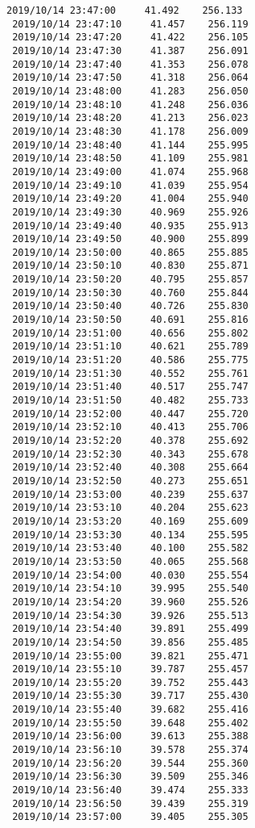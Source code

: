 \documentclass[11pt]{article}
\begin{document}
\begin{Verbatim}[commandchars=\\\{\}]
 2019/10/14 23:47:00     41.492    256.133
 2019/10/14 23:47:10     41.457    256.119
 2019/10/14 23:47:20     41.422    256.105
 2019/10/14 23:47:30     41.387    256.091
 2019/10/14 23:47:40     41.353    256.078
 2019/10/14 23:47:50     41.318    256.064
 2019/10/14 23:48:00     41.283    256.050
 2019/10/14 23:48:10     41.248    256.036
 2019/10/14 23:48:20     41.213    256.023
 2019/10/14 23:48:30     41.178    256.009
 2019/10/14 23:48:40     41.144    255.995
 2019/10/14 23:48:50     41.109    255.981
 2019/10/14 23:49:00     41.074    255.968
 2019/10/14 23:49:10     41.039    255.954
 2019/10/14 23:49:20     41.004    255.940
 2019/10/14 23:49:30     40.969    255.926
 2019/10/14 23:49:40     40.935    255.913
 2019/10/14 23:49:50     40.900    255.899
 2019/10/14 23:50:00     40.865    255.885
 2019/10/14 23:50:10     40.830    255.871
 2019/10/14 23:50:20     40.795    255.857
 2019/10/14 23:50:30     40.760    255.844
 2019/10/14 23:50:40     40.726    255.830
 2019/10/14 23:50:50     40.691    255.816
 2019/10/14 23:51:00     40.656    255.802
 2019/10/14 23:51:10     40.621    255.789
 2019/10/14 23:51:20     40.586    255.775
 2019/10/14 23:51:30     40.552    255.761
 2019/10/14 23:51:40     40.517    255.747
 2019/10/14 23:51:50     40.482    255.733
 2019/10/14 23:52:00     40.447    255.720
 2019/10/14 23:52:10     40.413    255.706
 2019/10/14 23:52:20     40.378    255.692
 2019/10/14 23:52:30     40.343    255.678
 2019/10/14 23:52:40     40.308    255.664
 2019/10/14 23:52:50     40.273    255.651
 2019/10/14 23:53:00     40.239    255.637
 2019/10/14 23:53:10     40.204    255.623
 2019/10/14 23:53:20     40.169    255.609
 2019/10/14 23:53:30     40.134    255.595
 2019/10/14 23:53:40     40.100    255.582
 2019/10/14 23:53:50     40.065    255.568
 2019/10/14 23:54:00     40.030    255.554
 2019/10/14 23:54:10     39.995    255.540
 2019/10/14 23:54:20     39.960    255.526
 2019/10/14 23:54:30     39.926    255.513
 2019/10/14 23:54:40     39.891    255.499
 2019/10/14 23:54:50     39.856    255.485
 2019/10/14 23:55:00     39.821    255.471
 2019/10/14 23:55:10     39.787    255.457
 2019/10/14 23:55:20     39.752    255.443
 2019/10/14 23:55:30     39.717    255.430
 2019/10/14 23:55:40     39.682    255.416
 2019/10/14 23:55:50     39.648    255.402
 2019/10/14 23:56:00     39.613    255.388
 2019/10/14 23:56:10     39.578    255.374
 2019/10/14 23:56:20     39.544    255.360
 2019/10/14 23:56:30     39.509    255.346
 2019/10/14 23:56:40     39.474    255.333
 2019/10/14 23:56:50     39.439    255.319
 2019/10/14 23:57:00     39.405    255.305

\end{Verbatim}
\end{document}
